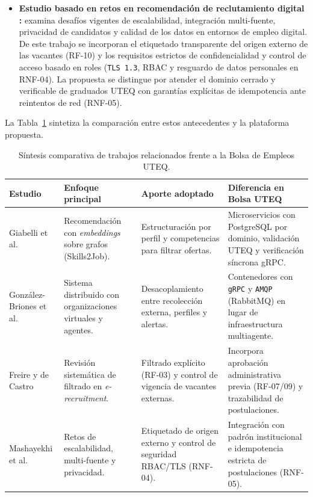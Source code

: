 \documentclass[11pt,a4paper]{article}
\begin{document}
\begin{itemize}
    \item \textbf{Estudio basado en retos en recomendación de reclutamiento digital \cite{mashayekhi2024}:} examina desafíos vigentes de escalabilidad, integración multi-fuente, privacidad de candidatos y calidad de los datos en entornos de empleo digital. De este trabajo se incorporan el etiquetado transparente del origen externo de las vacantes (RF-10) y los requisitos estrictos de confidencialidad y control de acceso basado en roles (\texttt{TLS 1.3}, RBAC y resguardo de datos personales en RNF-04). La propuesta se distingue por atender el dominio cerrado y verificable de graduados UTEQ con garantías explícitas de idempotencia ante reintentos de red (RNF-05).
\end{itemize}

La Tabla~\ref{tab:trabajos-relacionados} sintetiza la comparación entre estos antecedentes y la plataforma propuesta.

\begin{table}[htbp]
\centering
\caption{Síntesis comparativa de trabajos relacionados frente a la Bolsa de Empleos UTEQ.}
\label{tab:trabajos-relacionados}
\small
\begin{tabularx}{\textwidth}{>{\raggedright\arraybackslash}p{2.7cm} >{\raggedright\arraybackslash}p{3.1cm} >{\raggedright\arraybackslash}p{3.8cm} X}
\toprule
\textbf{Estudio} & \textbf{Enfoque principal} & \textbf{Aporte adoptado} & \textbf{Diferencia en Bolsa UTEQ} \\
\midrule
Giabelli et al. \cite{giabelli2021} & Recomendación con \textit{embeddings} sobre grafos (Skills2Job). & Estructuración por perfil y competencias para filtrar ofertas. & Microservicios con PostgreSQL por dominio, validación UTEQ y verificación síncrona gRPC. \\
González-Briones et al. \cite{gonzalezbriones2024} & Sistema distribuido con organizaciones virtuales y agentes. & Desacoplamiento entre recolección externa, perfiles y alertas. & Contenedores con \texttt{gRPC} y \texttt{AMQP} (RabbitMQ) en lugar de infraestructura multiagente. \\
Freire y de Castro \cite{freire2021} & Revisión sistemática de filtrado en \textit{e-recruitment}. & Filtrado explícito (RF-03) y control de vigencia de vacantes externas. & Incorpora aprobación administrativa previa (RF-07/09) y trazabilidad de postulaciones. \\
Mashayekhi et al. \cite{mashayekhi2024} & Retos de escalabilidad, multi-fuente y privacidad. & Etiquetado de origen externo y control de seguridad RBAC/TLS (RNF-04). & Integración con padrón institucional e idempotencia estricta de postulaciones (RNF-05). \\
\bottomrule
\end{tabularx}
\end{table}
\end{document}
